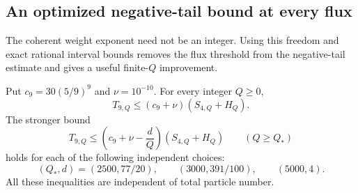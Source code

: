 \subsection{An optimized negative-tail bound at every flux}
\label{app:optimized-tail}

The coherent weight exponent need not be an integer. Using this freedom
and exact rational interval bounds removes the flux threshold from the
negative-tail estimate and gives a useful finite-$Q$ improvement.

\begin{lemma}\label{lem:optimized-tail}
Put $c_9=30(5/9)^9$ and $\nu=10^{-10}$. For every integer $Q\ge0$,
\begin{equation}\label{eq:optimized-tail-all-Q}
 T_{9,Q}\le(c_9+\nu)(S_{4,Q}+H_Q).
\end{equation}
The stronger bound
\begin{equation}\label{eq:optimized-tail-improvement}
 T_{9,Q}\le\left(c_9+\nu-\frac dQ\right)(S_{4,Q}+H_Q)
 \qquad(Q\ge Q_*)
\end{equation}
holds for each of the following independent choices:
\begin{equation}\label{eq:optimized-tail-choices}
 (Q_*,d)=(2500,77/20),\qquad(3000,391/100),\qquad(5000,4).
\end{equation}
All these inequalities are independent of total particle number.
\end{lemma}
